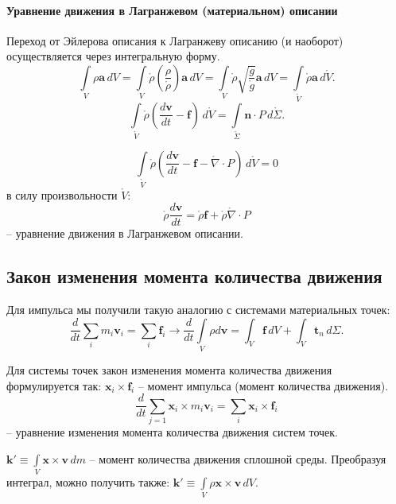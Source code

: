 \paragraph{Уравнение движения в Лагранжевом (материальном) описании}

Переход от Эйлерова описания к Лагранжеву описанию (и наоборот) осуществляется
через интегральную форму.
\[
  \int\limits_V \rho \mathbf{a} \, dV
  = \int\limits_V \mathring{\rho} \left( \dfrac{\rho}{\mathring{\rho}} \right) \mathbf{a} \, dV
  = \int\limits_V \mathring{\rho} \sqrt{\dfrac{g}{\mathring{g}}} \mathbf{a} \, dV
  = \int\limits_{\mathring{V}} \mathring{\rho} \mathbf{a} \, d\mathring{V}.
\]
\[
  \int\limits_{\mathring{V}} \mathring{\rho} \left( \dfrac{d\mathbf{v}}{dt} -\mathbf{f} \right) \, d\mathring{V} = \int\limits_{\mathring{\Sigma}} \mathbf{n} \cdot P \, d\mathring{\Sigma}.
\]


\[
  \int\limits_{\mathring{V}} \mathring{\rho} \left( \dfrac{d\mathbf{v}}{dt} - \mathbf{f} - \mathring{\nabla} \cdot P \right) \, d\mathring{V} = 0
\]
в силу произвольности $\mathring{V}$:
\[
  \mathring{\rho} \dfrac{d\mathbf{v}}{dt} = \mathring{\rho} \mathbf{f} + \mathring{\rho} \mathring{\nabla} \cdot P
\]
-- уравнение движения в Лагранжевом описании.


\subsection{Закон изменения момента количества движения}
Для импульса мы получили такую аналогию с системами материальных точек:
\[
  \dfrac{d}{dt} \sum_i m_i \mathbf{v}_i = \sum_i \mathbf{f}_i
  \rightarrow
  \dfrac{d}{dt} \int\limits_V \rho d\mathbf{v} = \int_V \mathbf{f}\, dV + \int_V \mathbf{t}_n \, d\Sigma.
\]

Для системы точек закон изменения момента количества движения формулируется так:
$\mathbf{x}_i \times \mathbf{f}_i$ -- момент импульса (момент количества движения).
\[
  \dfrac{d}{dt} \sum_{j=1} \mathbf{x}_i \times m_i \mathbf{v}_i = \sum_i \mathbf{x}_i \times \mathbf{f}_i
\]
-- уравнение изменения момента количества движения систем точек.

\begin{definition}
  $\mathbf{k}' \equiv \int\limits_V \mathbf{x} \times \mathbf{v} \, dm$ -- момент
  количества движения сплошной среды.
  Преобразуя интеграл, можно получить также:
  $\mathbf{k}' \equiv \int\limits_V \rho \mathbf{x} \times \mathbf{v} \, dV$.
\end{definition}

